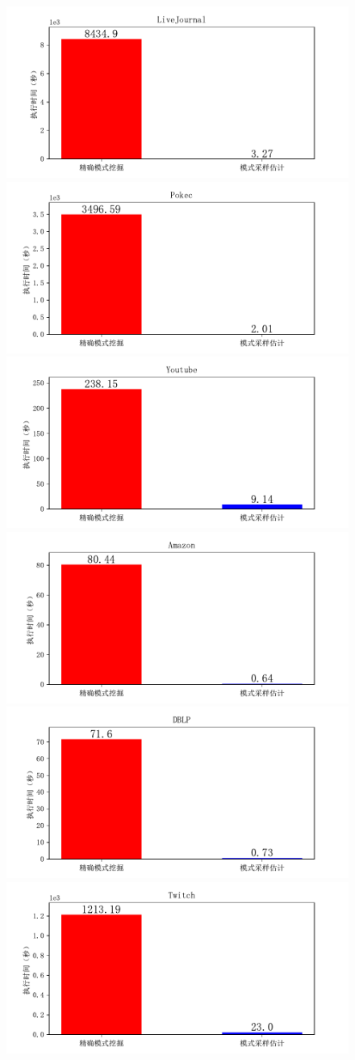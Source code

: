 \documentclass[master]{thesis-uestc}
\begin{document}
\begin{figure}
    \includegraphics[width=0.5\linewidth]{pic/samp-cmp-accurate/LiveJournal.pdf}%
    \includegraphics[width=0.5\linewidth]{pic/samp-cmp-accurate/Pokec.pdf}\\
    \includegraphics[width=0.5\linewidth]{pic/samp-cmp-accurate/Youtube.pdf}%
    \includegraphics[width=0.5\linewidth]{pic/samp-cmp-accurate/Amazon.pdf}\\
    \includegraphics[width=0.5\linewidth]{pic/samp-cmp-accurate/DBLP.pdf}%
    \includegraphics[width=0.5\linewidth]{pic/samp-cmp-accurate/Twitch.pdf}\\

\end{figure}
\end{document}
